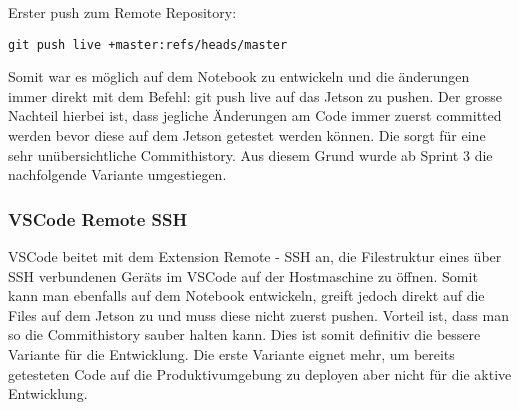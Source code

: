 Erster push zum Remote Repository:
\begin{verbatim}
git push live +master:refs/heads/master
\end{verbatim}


Somit war es möglich auf dem Notebook zu entwickeln und die änderungen immer direkt mit dem Befehl: git push live auf das Jetson zu pushen. Der grosse Nachteil hierbei ist, dass jegliche Änderungen am Code immer zuerst committed werden bevor diese auf dem Jetson getestet werden können. Die sorgt für eine sehr unübersichtliche Commithistory. Aus diesem Grund wurde ab Sprint 3 die nachfolgende Variante umgestiegen.

\subsubsection{VSCode Remote SSH}
VSCode beitet mit dem Extension Remote - SSH \cite{VSCode-Remote-SSH} an, die Filestruktur eines über SSH verbundenen Geräts im VSCode auf der Hostmaschine zu öffnen. Somit kann man ebenfalls auf dem Notebook entwickeln, greift jedoch direkt auf die Files auf dem Jetson zu und muss diese nicht zuerst pushen. Vorteil ist, dass man so die Commithistory sauber halten kann. Dies ist somit definitiv die bessere Variante für die Entwicklung. Die erste Variante eignet mehr, um bereits getesteten Code auf die Produktivumgebung zu deployen aber nicht für die aktive Entwicklung.